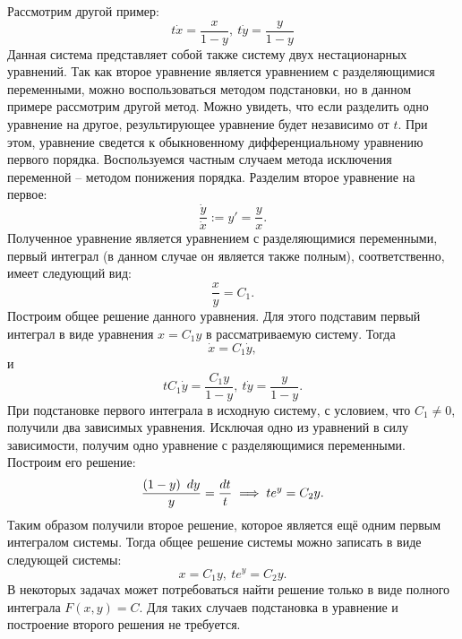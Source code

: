 		Рассмотрим другой пример:
		\[ t\dot{x} = \frac{x}{1 - y}, ~ t\dot{y} = \frac{y}{1 - y} \]
		Данная система представляет собой также систему двух нестационарных уравнений. Так как второе уравнение является уравнением с разделяющимися переменными, можно воспользоваться методом подстановки, но в данном примере рассмотрим другой метод. Можно увидеть, что если разделить одно уравнение на другое, результирующее уравнение будет независимо от $t$. При этом, уравнение сведется к обыкновенному дифференциальному уравнению первого порядка. Воспользуемся частным случаем метода исключения переменной -- методом понижения порядка. Разделим второе уравнение на первое:
		\[ \frac{\dot{y}}{\dot{x}} := y' = \frac{y}{x}. \]
		Полученное уравнение является уравнением с разделяющимися переменными, первый интеграл (в данном случае он является также полным), соответственно, имеет следующий вид:
		\[ \frac{x}{y} = C_1. \]
		Построим общее решение данного уравнения. Для этого подставим первый интеграл в виде уравнения $x = C_1 y$ в рассматриваемую систему. Тогда
		\[ \dot{x} = C_1 \dot{y}, \]
		и
		\[ t C_1 \dot{y} = \frac{C_1 y}{1 - y}, ~ t \dot{y} = \frac{y}{1 - y}. \]
		При подстановке первого интеграла в исходную систему, с условием, что $C_1 \neq 0$, получили два зависимых уравнения. Исключая одно из уравнений в силу зависимости, получим одно уравнение с разделяющимися переменными. Построим его решение:
		\[ \frac{\left( 1 - y \right) ~ dy}{y} = \frac{dt}{t} \implies t e^{y} = C_2 y. \]
		Таким образом получили второе решение, которое является ещё одним первым интегралом системы. Тогда общее решение системы можно записать в виде следующей системы:
		\[ x = C_1 y, ~ t e^{y} = C_2 y. \]
		В некоторых задачах может потребоваться найти решение только в виде полного интеграла $F(x, y) = C$. Для таких случаев подстановка в уравнение и построение второго решения не требуется.

		\vspace{10pt}

